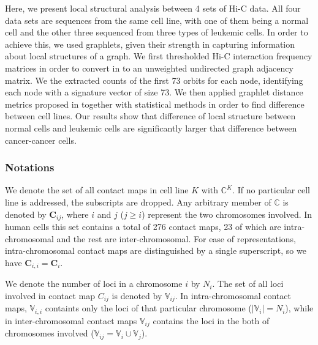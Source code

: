 \documentclass[]{article}
\begin{document}
Here, we present local structural analysis between
4 sets of Hi-C data. All four data sets are sequences
from the same cell line, with one of them being
a normal cell and the other three sequenced from
three types of leukemic cells. In order to achieve
this, we used graphlets, given their strength in
capturing information about local structures of
a graph. We first thresholded Hi-C interaction frequency
matrices in order to convert in to an unweighted undirected
graph adjacency matrix. We the extracted counts of
the first 73 orbits for each node, identifying each
node with a signature vector of size 73. We then
applied graphlet distance metrics proposed in
\cite{prvzulj2007biological} together with statistical methods
in order to find difference between cell lines.
Our results show that difference of local structure
between normal cells and leukemic cells are significantly
larger that difference between cancer-cancer cells.  

\subsubsection{Notations}

We denote the set of all contact maps in cell line $K$ with 
$\mathbb{C}^K$. If no particular cell line is addressed, the
subscripts are dropped.
Any arbitrary member of $\mathbb{C}$ is denoted by 
$\mathbf{C}_{ij}$, where $i$ and $j$ ($j \ge i$) 
represent the two chromosomes involved. 
In human cells this set contains a total of 276 contact maps,
23 of which are intra-chromosomal and the rest are inter-chromosomal.
For ease of representations, intra-chromosomal contact maps are
distinguished by a single superscript, so we have $\mathbf{C}_{i,i} =
\mathbf{C}_i$.

We denote the number of loci in a chromosome $i$ by $N_i$.
The set of all loci involved in contact map $C_{ij}$ is denoted 
by $\mathbb{V}_{ij}$.
In intra-chromosomal contact maps, $\mathbb{V}_{i,i}$ containts only the 
loci of that particular chromosome ($|\mathbb{V}_i| = N_i$), while in 
inter-chromosomal contact maps $\mathbb{V}_{ij}$ contains the loci in
the both of chromosomes involved 
($\mathbb{V}_{ij} = \mathbb{V}_i \cup \mathbb{V}_j$).
\end{document}
